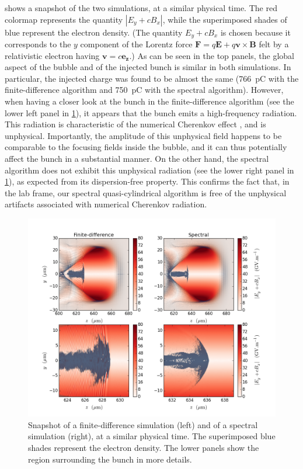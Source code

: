 \documentclass[1p,times,authoryear]{elsarticle}
\renewcommand{\vec}[1]{\boldsymbol{#1}}
\begin{document}
 shows a snapshot of the two
simulations, at a similar physical time. The red colormap represents the quantity
$|E_y+cB_x|$, while the superimposed shades of blue represent the electron density. (The
quantity $E_y+cB_x$ is chosen because it corresponds to the $y$ component of
the Lorentz force $\vec{F} = q\vec{E} + q\vec{v}\times\vec{B}$ felt by
a relativistic electron having $\vec{v} = c\vec{e_z}$.) As can be seen
in the top panels, the global aspect of the bubble and of the injected
bunch is similar in both simulations. In particular, the injected
charge was found to be almost the same (766~pC with the
finite-difference algorithm and 750~pC with the spectral
algorithm). However, when having a closer look at the bunch in the
finite-difference algorithm (see the lower left panel in
\cref{fig:Cherenkov}), it appears that the bunch emits a
high-frequency radiation. This radiation is characteristic of the
numerical Cherenkov effect \citep{LehePRSTAB2013}, and is
unphysical. Importantly, the amplitude of this unphysical field
happens to be comparable to the focusing
fields inside the bubble, and it can thus potentially affect the bunch
in a substantial manner. On the other hand, the spectral algorithm does not
exhibit this unphysical radiation (see the lower right panel in
\cref{fig:Cherenkov}), as expected from its dispersion-free property. 
This confirms the fact that, in the lab frame, our spectral
quasi-cylindrical algorithm is free of
the unphysical artifacts associated with numerical Cherenkov radiation.

\begin{figure}[!h]
\centering
\includegraphics[width=\textwidth]{figures/Cherenkov.png}
\caption{\label{fig:Cherenkov}Snapshot of a finite-difference
  simulation (left) and of a spectral simulation (right), at a similar
  physical time. The superimposed blue shades represent the electron
  density. The lower panels show the region surrounding the
  bunch in more details.}
\end{figure}
\end{document}
